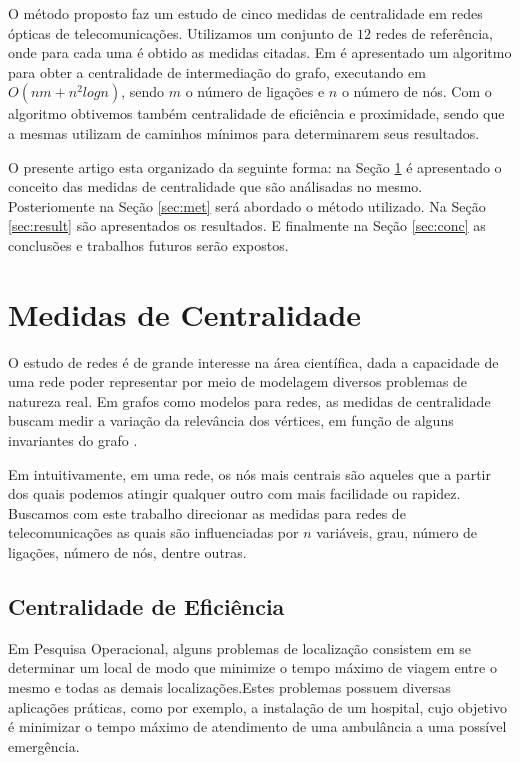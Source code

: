 \documentclass[12pt]{article}
\begin{document}
O método proposto faz um estudo de cinco medidas de centralidade em redes ópticas de telecomunicações.
Utilizamos um conjunto de $12$ redes de referência, onde para cada uma é obtido as medidas citadas.
Em \cite{Brandes01afaster} é apresentado um algoritmo para obter a centralidade de intermediação do grafo, executando em $O(nm + n^2 log n)$, sendo $m$ o número de ligações e $n$ o número de nós.
Com o algoritmo obtivemos também centralidade de eficiência e proximidade, sendo que a mesmas utilizam de caminhos mínimos para determinarem seus resultados.

O presente artigo esta organizado da seguinte forma: na Seção \ref{sec:mc} é apresentado o conceito das medidas de centralidade que são análisadas no mesmo.
Posteriomente na  Seção \ref{sec:met} será abordado o método utilizado. 
Na Seção \ref{sec:result} são apresentados os resultados.
E finalmente na Seção \ref{sec:conc} as conclusões e trabalhos futuros serão expostos. 

\section{Medidas de Centralidade}\label{sec:mc}

O estudo de redes é de grande interesse na área científica, dada a capacidade de uma rede poder representar por meio de modelagem diversos problemas de natureza real.
Em grafos como modelos para redes, as medidas de centralidade buscam medir a variação da relevância dos vértices, em função de alguns invariantes do grafo \cite{freitas}.

Em \cite{freitas} intuitivamente, em uma rede, os nós mais centrais são aqueles que a partir dos quais podemos atingir qualquer outro com mais facilidade ou rapidez. Buscamos com este trabalho direcionar as medidas para redes de telecomunicações as quais são influenciadas por $n$ variáveis, grau, número de ligações, número de nós, dentre outras.

\subsection{Centralidade de Eficiência}
Em  Pesquisa  Operacional,  alguns  problemas  de  localização  consistem  em  se determinar um local de modo que minimize o tempo máximo de viagem entre o mesmo e todas as demais localizações.Estes problemas possuem diversas aplicações práticas, como  por  exemplo,  a  instalação  de  um  hospital,  cujo objetivo  é  minimizar  o  tempo máximo de atendimento de uma ambulância a uma possível emergência\cite{freitas}.
\end{document}
